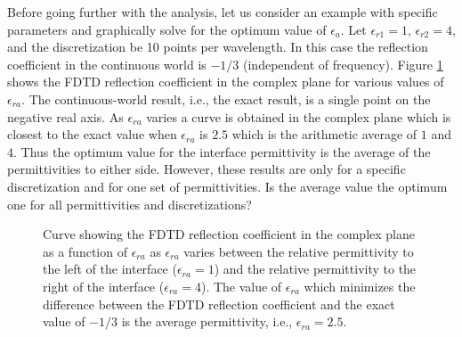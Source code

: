Before going further with the analysis, let us consider an example
with specific parameters and graphically solve for the optimum value
of $\epsilon_a$.  Let $\epsilon_{r1} = 1$, $\epsilon_{r2} = 4$, and
the discretization be 10 points per wavelength.  In this case the
reflection coefficient in the continuous world is $-1/3$ (independent
of frequency).  Figure \ref{fig:refCoefLayer} shows the FDTD
reflection coefficient in the complex plane for various values of
$\epsilon_{ra}$.  The continuous-world result, i.e., the exact result,
is a single point on the negative real axis.  As $\epsilon_{ra}$
varies a curve is obtained in the complex plane which is closest to
the exact value when $\epsilon_{ra}$ is $2.5$ which is the arithmetic
average of $1$ and $4$.  Thus the optimum value for the interface
permittivity is the average of the permittivities to either side.
However, these results are only for a specific discretization and for
one set of permittivities.  Is the average value the optimum one for
all permittivities and discretizations?

\begin{figure}
  \begin{center}
  \end{center}
  \caption{Curve showing the FDTD reflection coefficient in the
    complex plane as a function of $\epsilon_{ra}$ as $\epsilon_{ra}$
    varies between the relative permittivity to the left of the
    interface ($\epsilon_{ra}=1$) and the relative permittivity to the
    right of the interface ($\epsilon_{ra}=4$).  The value of
    $\epsilon_{ra}$ which minimizes the difference between the FDTD
    reflection coefficient and the exact value of $-1/3$ is the
    average permittivity, i.e., $\epsilon_{ra}=2.5$. }
  \label{fig:refCoefLayer}
\end{figure}

